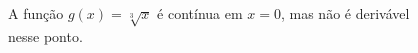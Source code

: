 \begin{frame}
  \begin{columns}[onlytextwidth]
    \begin{column}{0.49\textwidth}\vspace{-0.5cm}
      \begin{example}
        A função $g(x) = \sqrt[3]{x}$ é contínua em $x = 0$, mas não é derivável nesse ponto.
      \end{example}
    \end{column}
    \begin{column}{0.5\textwidth}\vspace{-0.5cm}
      \begin{figure}
      \end{figure}
    \end{column}
  \end{columns}
\end{frame}
